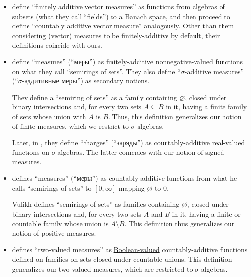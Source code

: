 \begin{remark}
\begin{itemize}
    \item {} define \enquote{finitely additive vector measures} as functions from algebras of subsets (what they call \enquote{fields}) to a Banach space, and then proceed to define \enquote{countably additive vector measure} analogously. Other than them considering (vector) measures to be finitely-additive by default, their definitions coincide with ours.

    \item {} define \enquote{measures} (\enquote{меры}) as finitely-additive nonnegative-valued functions on what they call \enquote{semirings of sets}. They also define \enquote{\( \sigma \)-additive measures} (\enquote{\( \sigma \)-аддитивные меры}) as secondary notions.

    They define a \enquote{semiring of sets} as a family containing \( \varnothing \), closed under binary intersections and, for every two sets \( A \subseteq B \) in it, having a finite family of sets whose union with \( A \) is \( B \). Thus, this definition generalizes our notion of finite measures, which we restrict to \( \sigma \)-algebras.

    Later, in \cite[def. 20.1]{ДьяченкоУльянов1998МераИИнтеграл}, they define \enquote{charges} (\enquote{заряды}) as countably-additive real-valued functions on \( \sigma \)-algebras. The latter coincides with our notion of signed measures.

    \item {} defines \enquote{measures} (\enquote{меры}) as countably-additive functions from what he calls \enquote{semirings of sets} to \( [0, \infty] \) mapping \( \varnothing \) to \( 0 \).

    Vulikh defines \enquote{semirings of sets} as families containing \( \varnothing \), closed under binary intersections and, for every two sets \( A \) and \( B \) in it, having a finite or countable family whose union is \( A \setminus B \). This definition thus generalizes our notion of positive measures.

    \item {} defines \enquote{two-valued measures} as \hyperref[def:boolean_function]{Boolean-valued} countably-additive functions defined on families on sets closed under countable unions. This definition generalizes our two-valued measures, which are restricted to \( \sigma \)-algebras.
  \end{itemize}


\end{remark}
